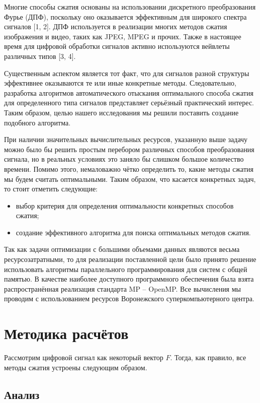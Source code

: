\documentclass[11pt, oneside, a4paper]{article}
\begin{document}
Многие способы сжатия основаны на использовании дискретного преобразования Фурье (ДПФ), поскольку оно оказывается эффективным для широкого спектра сигналов [1, 2]. ДПФ используется в реализации многих методов сжатия изображения и видео, таких как JPEG, MPEG и прочих. Также в настоящее время для цифровой обработки сигналов активно используются вейвлеты различных типов [3, 4].

Существенным аспектом является тот факт, что для сигналов разной структуры эффективнее оказываются те или иные конкретные методы. Следовательно, разработка алгоритмов автоматического отыскания оптимального способа сжатия для определенного типа сигналов представляет серьёзный практический интерес. Таким образом, целью нашего исследования мы решили поставить создание подобного алгоритма.

При наличии значительных вычислительных ресурсов, указанную выше задачу можно было бы решить простым перебором различных способов преобразования сигнала, но в реальных условиях это заняло бы слишком большое количество времени. Помимо этого, немаловажно чётко определить то, какие методы сжатия мы будем считать оптимальными. Таким образом, что касается конкретных задач, то стоит отметить следующие:
\begin{itemize}
\item выбор критерия для определения оптимальности конкретных способов сжатия;
\item создание эффективного алгоритма для поиска оптимальных методов сжатия.
\end{itemize}

Так как задачи оптимизации с большими объемами данных являются весьма  ресурсозатратными, то для реализации поставленной цели было принято решение использовать алгоритмы параллельного программирования для систем с общей памятью. В качестве наиболее доступного программного обеспечения была взята распространённая реализация стандарта MP – OpenMP. Все вычисления мы проводим с использованием ресурсов Воронежского суперкомпьютерного центра.

\section{Методика расчётов}

Рассмотрим цифровой сигнал как некоторый вектор $F$. Тогда, как правило, все методы сжатия устроены следующим образом.

\subsection{Анализ} 
\end{document}
